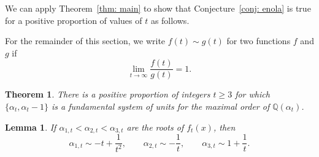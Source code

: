\documentclass[11pt]{amsart}
\numberwithin{equation}{section}
\newtheorem{theorem}[algorithm]{Theorem}
\newtheorem{lemma}[algorithm]{Lemma}
\theoremstyle{definition}
\newcommand{\QQ}{\mathbb{Q}}
\begin{document}
We can apply Theorem~\ref{thm: main} to show that Conjecture~\ref{conj: enola} is true for a positive proportion of values of $t$ as follows. 

For the remainder of this section, we write \(f(t) \sim g(t)\) for two functions \(f\) and \(g\) if
    \[
        \lim_{t\to\infty}\frac{f(t)}{g(t)}=1.
    \]

\begin{theorem}
    \label{thm: ennola}
    There is a positive proportion of integers $t \geq 3$ for which $\{\alpha_t, \alpha_t - 1\}$ is a fundamental system of units for the maximal order of $\QQ(\alpha_t)$.
\end{theorem}

\begin{lemma}
\label{lem: root-asymptotics}
    If $\alpha_{1,t} < \alpha_{2,t} < \alpha_{3,t}$ are the roots of $f_t(x)$, then
    \[
       \alpha_{1,t} \sim -t + \frac{1}{t^2}, \qquad \alpha_{2,t} \sim -\frac{1}{t}, \qquad \alpha_{3,t} \sim 1 + \frac{1}{t}.
    \]
\end{lemma}
\end{document}
